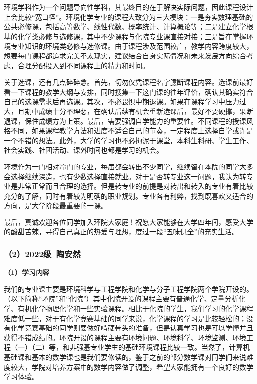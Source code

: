 \documentclass[11pt,oneside]{book}
\begin{document}
\vspace{10pt}

环境学科作为一个问题导向性学科，其最终目的在于解决实际问题，因此课程设计上会比较“宽口径”。环境化学专业的课程大致分为三大模块：一是夯实数理基础的公共必修课，包括高等数学、线性代数、概率统计、计算概论等；二是建立化学根基的化学类必修与选修课，其中不少课程与化院专业课直接对接；三是旨在掌握环境专业知识的环境类必修与选修课。由于课程涉及范围较广，教学内容跨度较大，想要每门课程都追求完美不太现实，建议结合自身实际情况和未来发展方向综合考虑，合理分配投入到不同课程上的精力和时间。

\vspace{10pt}

关于选课，还有几点碎碎念。首先，切勿仅凭课程名字臆断课程内容。选课前最好看一下课程的教学大纲与安排，同时搜集一下这门课的往年评价，确认其确实符合自己的选课需求后再选课。其次，不必畏惧中期退课。如果在课程学习中压力过大，且期中成绩十分不理想，在确认后续有机会重新选课后，最好不要硬撑，果断退课，保住成绩方为上策。最后，需要强调自学能力的重要性。不同课程的授课风格不同，如果课程教学方法和进度不适合自己的节奏，一定程度上选择自学或许是一个不错的想法。此外，大学的学习也不必拘泥于课堂，本科生科研、学生工作、社会实践、社团活动、课外时间也都是学习的机会。

\vspace{10pt}

环境作为一门相对冷门的专业，每届都会转出不少同学，继续留在本院的同学大多会选择继续深造，也有少数选择直接就业。对于是否转专业这一问题，我认为转专业是非常正常而且合理的选择。但是转专业的前提是对转出和转入的专业有着比较充分的了解，同时有着较为明确的职业规划。专业各有利弊，找到既喜欢又适合的方向，是大学阶段最重要的一课。

\vspace{10pt}

最后，真诚欢迎各位同学加入环院大家庭！祝愿大家能够在大学四年间，感受大学的酸甜苦辣，寻得自己真正的热爱与理想，度过一段“五味俱全”的充实生活。

\subsubsection{（2）2022级\ 陶安然}

\textbf{（1）学习内容}

我们的专业课主要是环境科学与工程学院和化学与分子工程学院两个学院开设的。（以下简称“环院”和“化院”）其中化院开设的课程主要有普通化学、定量分析化学、有机化学物理化学和一些实验课程。相比于化院的学生，我们学习的化学课程难度低一些，对于有化学竞赛基础的同学来说，化学课程的学习是比较轻松的；没有化学竞赛基础的同学则要做好啃硬骨头的准备，但是认真学习也是可以学懂并且获得不错成绩的。环院开设的课程主要有环境问题、环境科学、环境监测、环境工程（一）（二）等，和非强基专业学生的基础环境课程比较一致。当然了，计算机基础课和基本的数学课也是我们要修读的，鉴于之前的部分数学课对同学们来说难度较大，学院对培养方案中的数学内容做了调整，希望大家能拥有一个良好的数学学习体验。
\end{document}
